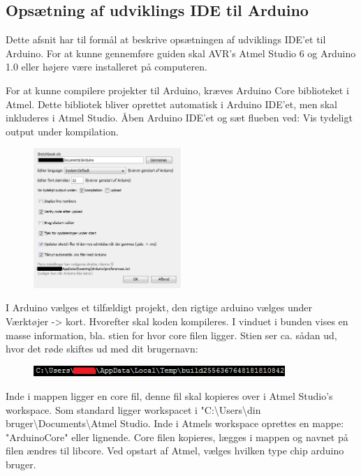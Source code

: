 \subsection{Opsætning af udviklings IDE til Arduino}

Dette afsnit har til formål at beskrive opsætningen af udviklings IDE'et til Arduino.
For at kunne gennemføre guiden skal AVR's Atmel Studio 6 og Arduino 1.0 eller højere være installeret på computeren. 

For at kunne compilere projekter til Arduino, kræves Arduino Core biblioteket i Atmel. Dette bibliotek bliver oprettet automatisk i Arduino IDE'et, men skal inkluderes i Atmel Studio.
Åben Arduino IDE'et og sæt flueben ved: Vis tydeligt output under kompilation.

\begin{figure}[H]
	\centering
	\includegraphics[width=0.5\textwidth]{Billeder/implementation/Howtoguide/Arduino_kompiler.png}
\end{figure}

I Arduino vælges et tilfældigt projekt, den rigtige arduino vælges under Værktøjer -> kort. Hvorefter skal koden kompileres. I vinduet i bunden vises en masse information, bla. stien for hvor core filen ligger. Stien ser ca. sådan ud, hvor det røde skiftes ud med dit brugernavn: 
\begin{figure}[H]
	\centering
	\includegraphics[width=0.85\textwidth]{Billeder/implementation/Howtoguide/core_sti.png}
\end{figure}
Inde i mappen ligger en core fil, denne fil skal kopieres over i Atmel Studio's workspace. Som standard ligger workspacet i "C:\textbackslash Users\textbackslash din bruger\textbackslash Documents\textbackslash Atmel Studio. 
Inde i Atmels workspace oprettes en mappe: "ArduinoCore" eller lignende. Core filen kopieres, lægges i mappen og navnet på filen ændres til libcore.
Ved opstart af Atmel, vælges hvilken type chip arduino bruger.

